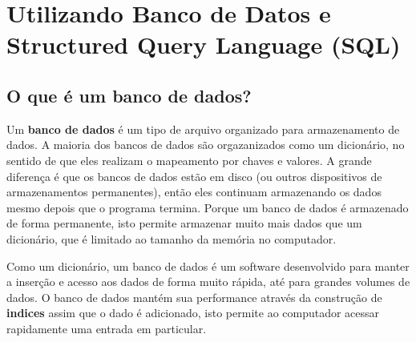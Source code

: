 
\chapter{Utilizando Banco de Datos e Structured Query Language (SQL)}

\section{O que é um banco de dados?}


Um {\bf banco de dados} é um tipo de arquivo organizado para armazenamento de
dados. A maioria dos bancos de dados são orgazanizados como um dicionário, no
sentido de que eles realizam o mapeamento por chaves e valores. A grande
diferença é que os bancos de dados estão em disco (ou outros dispositivos de
armazenamentos permanentes), então eles continuam armazenando os dados mesmo
depois que o programa termina. Porque um banco de dados é armazenado de forma
permanente, isto permite armazenar muito mais dados que um dicionário, que é
limitado ao tamanho da memória no computador.


Como um dicionário, um banco de dados é um software desenvolvido para manter a
inserção e acesso aos dados de forma muito rápida, até para grandes volumes de
dados. O banco de dados mantém sua performance através da construção de
{\bf indices} assim que o dado é adicionado, isto permite ao computador acessar
rapidamente uma entrada em particular.

